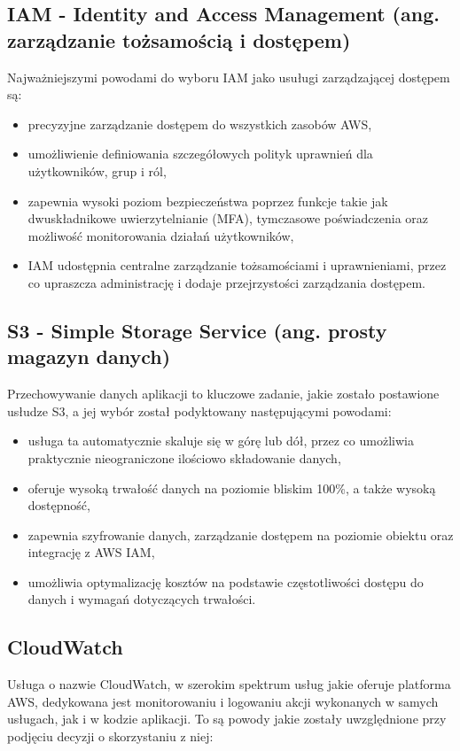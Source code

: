 \documentclass[12pt,twoside]{book}
\begin{document}
\subsection{IAM - Identity and Access Management (ang. zarządzanie tożsamością i dostępem)}
Najważniejszymi powodami do wyboru IAM jako usuługi zarządzającej dostępem są:

\begin{itemize}
\item precyzyjne zarządzanie dostępem do wszystkich zasobów AWS,
\item umożliwienie definiowania szczegółowych polityk uprawnień dla użytkowników, grup i ról,
\item zapewnia wysoki poziom bezpieczeństwa poprzez funkcje takie jak dwuskładnikowe uwierzytelnianie (MFA), tymczasowe poświadczenia oraz możliwość monitorowania działań użytkowników,
\item IAM udostępnia centralne zarządzanie tożsamościami i uprawnieniami, przez co upraszcza administrację i dodaje przejrzystości zarządzania dostępem. \cite{aws.iam}
\end{itemize}

\subsection{S3 - Simple Storage Service (ang. prosty magazyn danych)}
Przechowywanie danych aplikacji to kluczowe zadanie, jakie zostało postawione usłudze S3, a jej wybór został podyktowany następującymi powodami:

\begin{itemize}
\item usługa ta automatycznie skaluje się w górę lub dół, przez co umożliwia praktycznie nieograniczone ilościowo składowanie danych,
\item oferuje wysoką trwałość danych na poziomie bliskim 100\%, a także wysoką dostępność,
\item zapewnia szyfrowanie danych, zarządzanie dostępem na poziomie obiektu oraz integrację z AWS IAM,
\item umożliwia optymalizację kosztów na podstawie częstotliwości dostępu do danych i wymagań dotyczących trwałości. \cite{aws.s3}
\end{itemize}

\subsection{CloudWatch}
Usługa o nazwie CloudWatch, w szerokim spektrum usług jakie oferuje platforma AWS, dedykowana jest monitorowaniu i logowaniu akcji wykonanych w samych usługach, jak i w kodzie aplikacji. To są powody jakie zostały uwzględnione przy podjęciu decyzji o skorzystaniu z niej:
\end{document}
